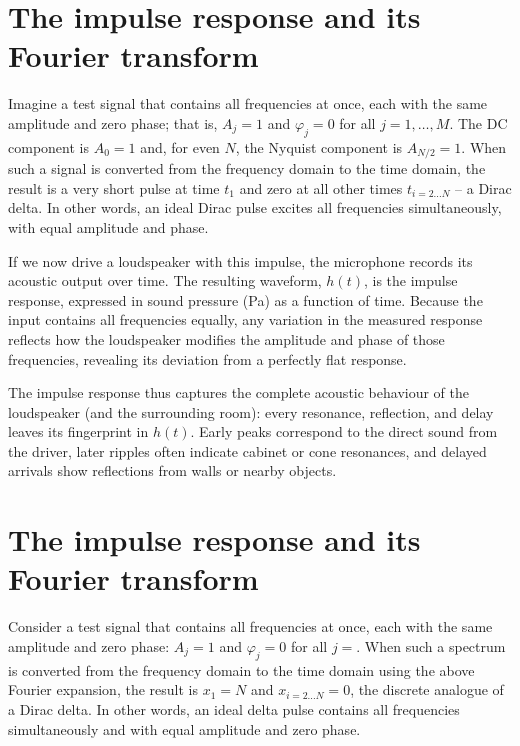 \documentclass[12pt,a4paper]{article}
\providecommand{\seclabel}[1]{\label{sec:#1}}
\begin{document}
\section{The impulse response and its Fourier transform}\seclabel{impulse_response}
Imagine a test signal that contains all frequencies at once, each with the same amplitude and zero phase; that is, $A_j = 1$ and $\varphi_j = 0$ for all $j = 1, \ldots, M$. The DC component is $A_0 = 1$ and, for even $N$, the Nyquist component is $A_{N/2} = 1$. When such a signal is converted from the frequency domain to the time domain, the result is a very short pulse at time $t_1$ and zero at all other times $t_{i = 2\ldots N}$ -- a Dirac delta. In other words, an ideal Dirac pulse excites all frequencies simultaneously, with equal amplitude and phase.

If we now drive a loudspeaker with this impulse, the microphone records its acoustic output over time.  
The resulting waveform, $h(t)$, is the impulse response, expressed in sound pressure (Pa) as a function of time.  
Because the input contains all frequencies equally, any variation in the measured response reflects how the loudspeaker modifies the amplitude and phase of those frequencies, revealing its deviation from a perfectly flat response.

The impulse response thus captures the complete acoustic behaviour of the loudspeaker (and the surrounding room): every resonance, reflection, and delay leaves its fingerprint in $h(t)$.  
Early peaks correspond to the direct sound from the driver, later ripples often indicate cabinet or cone resonances, and delayed arrivals show reflections from walls or nearby objects.


\section{The impulse response and its Fourier transform}

Consider a test signal that contains all frequencies at once, each with the same amplitude and zero phase: $A_j = 1$ and $\varphi_j = 0$ for all $j =$. When such a spectrum is converted from the frequency domain to the time domain using the above Fourier expansion, the result is $x_1 = N$ and $x_{i=2\ldots N} = 0$, the discrete analogue of a Dirac delta. In other words, an ideal delta pulse contains all frequencies simultaneously and with equal amplitude and zero phase.
\end{document}
